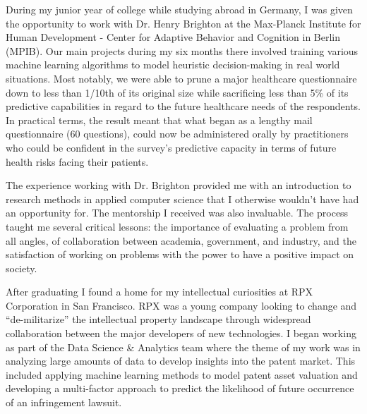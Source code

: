 
During my junior year of college while studying abroad in Germany, I was given the opportunity to work with Dr. Henry Brighton at the Max-Planck Institute for Human Development - Center for Adaptive Behavior and Cognition in Berlin (MPIB). Our main projects during my six months there involved training various machine learning algorithms to model heuristic decision-making in real world situations. Most notably, we were able to prune a major healthcare questionnaire down to less than 1/10th of its original size while sacrificing less than 5\% of its predictive capabilities in regard to the future healthcare needs of the respondents. In practical terms, the result meant that what began as a lengthy mail questionnaire (60 questions), could now be administered orally by practitioners who could be confident in the survey's predictive capacity in terms of future health risks facing their patients. 

The experience working with Dr. Brighton provided me with an introduction to research methods in applied computer science that I otherwise wouldn't have had an opportunity for. The mentorship I received was also invaluable. The process taught me several critical lessons: the importance of evaluating a problem from all angles, of collaboration between academia, government, and industry, and the satisfaction of working on problems with the power to have a positive impact on society.



After graduating I found a home for my intellectual curiosities at RPX Corporation in San Francisco. RPX was a young company looking to change and ``de-militarize'' the intellectual property landscape through widespread collaboration between the major developers of new technologies. I began working as part of the Data Science \& Analytics team where the theme of my work was in analyzing large amounts of data to develop insights into the patent market. This included applying machine learning methods to model patent asset valuation and developing a multi-factor approach to predict the likelihood of future occurrence of an infringement lawsuit.

